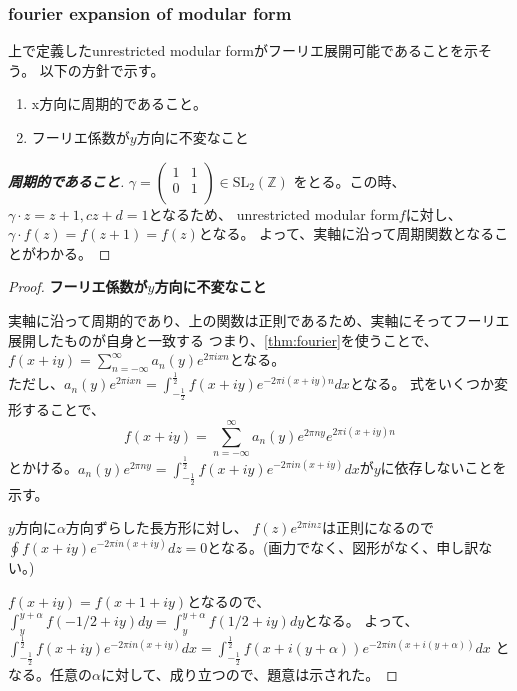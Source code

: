 \documentclass{ujarticle}
\begin{document}
\subsubsection{fourier expansion of modular form}
\label{sub:fourier expansion of modular form}
上で定義したunrestricted modular formがフーリエ展開可能であることを示そう。
以下の方針で示す。
\begin{enumerate}
  \setlength{\parskip}{0cm} %
  \setlength{\itemsep}{0cm} %
  \item x方向に周期的であること。
  \item フーリエ係数が$y$方向に不変なこと
\end{enumerate}
\begin{proof}[\bf{周期的であること}]


$\gamma = \begin{pmatrix}
  1 & 1 \\
  0 & 1 \\
\end{pmatrix} \in \mathrm{SL}_2(\mathbb{Z})$
をとる。この時、$\gamma \cdot z = z +1, cz+d =1$となるため、
unrestricted modular form$f$に対し、$\gamma \cdot f(z)= f(z +1)=f(z)$となる。
よって、実軸に沿って周期関数となることがわかる。
\end{proof}

\begin{proof}{\bf{フーリエ係数が$y$方向に不変なこと}}


実軸に沿って周期的であり、上の関数は正則であるため、実軸にそってフーリエ展開したものが自身と一致する
つまり、\ref{thm:fourier}を使うことで、$f(x + iy)= \displaystyle  \sum_{n= - \infty }^{\infty}a_n(y)e^{2 \pi i x n}$となる。\\
ただし、$a_n(y) e^{2 \pi i x n}= \int_{-\frac{1}{2}}^{\frac{1}{2}}f(x+iy)e^{-2 \pi i (x+iy) n}dx$となる。
式をいくつか変形することで、
\begin{equation*}
 f(x+iy)= \sum_{n= - \infty }^{\infty}a_n(y)e^{2 \pi n y} e^{2 \pi i (x+iy) n}
\end{equation*}
とかける。$a_n(y)e^{2 \pi n y}= \int_{-\frac{1}{2}}^{\frac{1}{2}}f(x+iy)e^{-2 \pi in(x+iy)}dx$が$y$に依存しないことを示す。

$y$方向に$\alpha$方向ずらした長方形に対し、
$f(z)e^{2 \pi in z}$は正則になるので
$\oint f(x+iy)e^{-2 \pi in(x+iy)}dz = 0$となる。(画力でなく、図形がなく、申し訳ない。)

$f(x + iy ) = f( x + 1 + iy)$となるので、
$\int_{y}^{y+ \alpha}f(-1/2 + iy)dy =\int_{y}^{y+ \alpha}f(1/2 + iy)dy $となる。
よって、
$\int_{-\frac{1}{2}}^{\frac{1}{2}}f(x+iy)e^{-2 \pi in(x+iy)}dx =
\int_{-\frac{1}{2}}^{\frac{1}{2}}f(x+i(y+\alpha))e^{-2 \pi in(x+i(y+\alpha))}dx$
となる。任意の$\alpha$に対して、成り立つので、題意は示された。
\end{proof}
\end{document}
